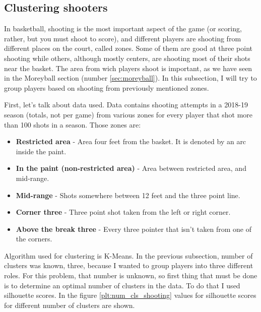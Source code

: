 \documentclass[a4paper]{article}
\begin{document}
\subsection{Clustering shooters}
\label{subsec:clust_shooters}

In basketball, shooting is the most important aspect of the game (or scoring, rather, but you must shoot to score), and different players are shooting from different places on the court, called zones. Some of them are good at three point shooting while others, although mostly centers, are shooting most of their shots near the basket. The area from wich players shoot is important, as we have seen in the Moreyball section (number \ref{sec:moreyball}). In this subsection, I will try to group players based on shooting from previously mentioned zones.

First, let's talk about data used. Data contains shooting attempts in a 2018-19 season (totals, not per game) from various zones for every player that shot more than 100 shots in a season. Those zones are:

\begin{itemize}
	\item \textbf{Restricted area} - Area four feet from the basket. It is denoted by an arc inside the paint.
	\item \textbf{In the paint (non-restricted area)} - Area between restricted area, and mid-range.
	\item \textbf{Mid-range} - Shots somewhere between 12 feet and the three point line.
	\item \textbf{Corner three} - Three point shot taken from the left or right corner.
	\item \textbf{Above the break three} - Every three pointer that isn't taken from one of the corners. 
\end{itemize}

Algorithm used for clustering is K-Means. In the previous subsection, number of clusters was known, three, because I wanted to group players into three different roles. For this problem, that number is unknown, so first thing that must be done is to determine an optimal number of clusters in the data. To do that I used silhouette scores. In the figure \ref{plt:num_cls_shooting} values for silhouette scores for different number of clusters are shown. 
\end{document}
